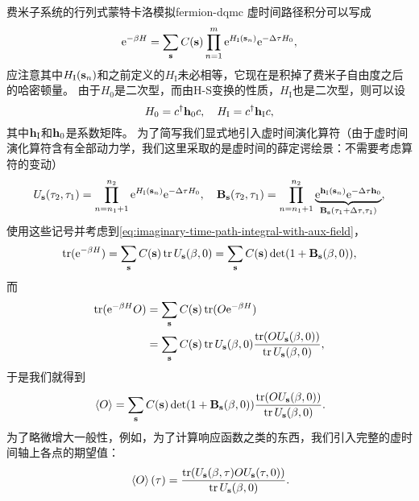\begin{back}{费米子系统的行列式蒙特卡洛模拟}{fermion-dqmc}
    虚时间路径积分可以写成
    \begin{equation}
        \mathrm{e}^{-\beta {H}} = \sum_{\vb{s}} C(\vb{s}) \prod_{n=1}^m \mathrm{e}^{H_\text{I}(\vb{s}_n)} \mathrm{e}^{-\Delta \tau {H}_0}, 
        \label{eq:imaginary-time-path-integral-with-aux-field}
    \end{equation}
    应注意其中$H_\text{I}(\vb{s}_n)$和之前定义的${H}_\text{I}$未必相等，它现在是积掉了费米子自由度之后的哈密顿量。
    由于${H}_0$是二次型，而由H-S变换的性质，${H}_\text{I}$也是二次型，则可以设
    \begin{equation}
        {H}_0 = {c}^\dagger \vb{h}_0 {c}, \quad {H}_\text{I} = {c}^\dagger \vb{h}_\text{I} {c},
    \end{equation}
    其中$\vb{h}_\text{I}$和$\vb{h}_0$是系数矩阵。
    为了简写我们显式地引入虚时间演化算符（由于虚时间演化算符含有全部动力学，我们这里采取的是虚时间的薛定谔绘景：不需要考虑算符的变动）
    \begin{equation}
        {U}_{\vb{s}}(\tau_2, \tau_1) = \prod_{n=n_1+1}^{n_2} \mathrm{e}^{ {H}_\text{I}(\vb{s}_n)} \mathrm{e}^{-\Delta \tau {H}_0}, \quad \vb{B}_{\vb{s}}(\tau_2, \tau_1) = \prod_{n=n_1+1}^{n_2} \underbrace{\mathrm{e}^{\vb{h}_\text{I}(\vb{s}_n)} \mathrm{e}^{-\Delta \tau \vb{h}_0}}_{\vb{B}_{\vb{s}}(\tau_1+\Delta \tau, \tau_1)},
    \end{equation}
    使用这些记号并考虑到\eqref{eq:imaginary-time-path-integral-with-aux-field}，
    \[
        \trace(\ee^{-\beta {H}}) = \sum_{\vb{s}} C(\vb{s}) \trace {U}_{\vb{s}}(\beta, 0) = \sum_{\vb{s}} C(\vb{s}) \det(1 + \vb{B}_{\vb{s}}(\beta, 0)),
    \]
    而
    \[
        \begin{aligned}
            \trace(\ee^{-\beta {H}} {O}) &= \sum_{\vb{s}} C(\vb{s}) \trace({O} \ee^{-\beta {H}}) \\
            &= \sum_{\vb{s}} C(\vb{s}) \trace{U}_{\vb{s}}(\beta, 0) \frac{\trace({O} {U}_{\vb{s}}(\beta, 0))}{\trace {U}_{\vb{s}}(\beta, 0)},
        \end{aligned} 
    \]
    于是我们就得到
    \begin{equation}
        \expval*{{O}} = \sum_{\vb{s}} C(\vb{s}) \det(1 + \vb{B}_{\vb{s}}(\beta, 0)) \frac{\trace({O} {U}_{\vb{s}}(\beta, 0))}{\trace {U}_{\vb{s}}(\beta, 0)}.
    \end{equation}
    为了略微增大一般性，例如，为了计算响应函数之类的东西，我们引入完整的虚时间轴上各点的期望值：
    \begin{equation}
        \expval*{{O}}(\tau) = \frac{\trace({U}_{\vb{s}}(\beta, \tau) {O} {U}_{\vb{s}}(\tau, 0))}{\trace {U}_{\vb{s}}(\beta, 0)}.
    \end{equation}


\end{back}
